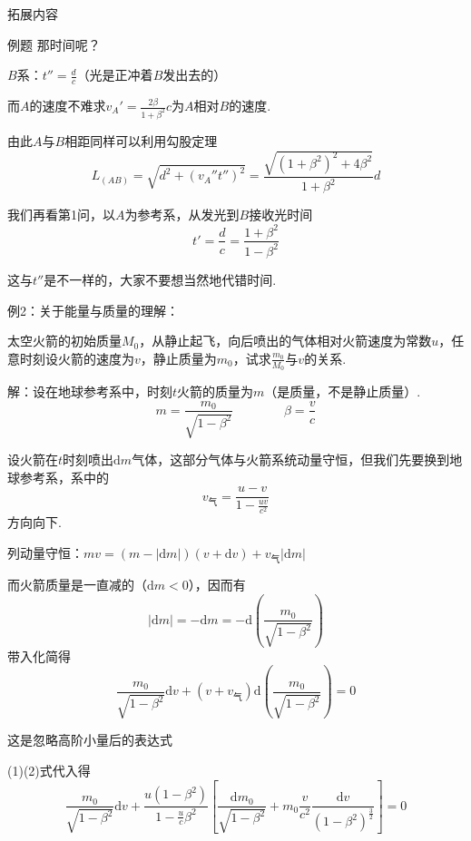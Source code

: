 \documentclass[a4paper,titlepage,onecolmn]{ctexart}
\newcommand{\di}[1]{\mathrm{d}#1}
\begin{document}
\begin{section}{拓展内容}
\begin{subsection}{例题}
那时间呢？

$B$系：$t''=\frac{d}{c}$（光是正冲着$B$发出去的）

而$A$的速度不难求\hspace{2em}$v_A'=\frac{2\beta}{1+\beta^2}c$为$A$相对$B$的速度.

由此$A$与$B$相距同样可以利用勾股定理
\begin{equation*}
L_(AB)=\sqrt{d^2+(v_A''t'')^2}=\frac{\sqrt{(1+\beta^2)^2+4\beta^2}}{1+\beta^2}d
\end{equation*}

我们再看第1问，以$A$为参考系，从发光到$B$接收光时间
\begin{equation*}
t'=\frac{d}{c}=\frac{1+\beta^2}{1-\beta^2}
\end{equation*}

这与$t''$是不一样的，大家不要想当然地代错时间.

例2：关于能量与质量的理解：

太空火箭的初始质量$M_0$，从静止起飞，向后喷出的气体相对火箭速度为常数$u$，任意时刻设火箭的速度为$v$，静止质量为$m_0$，试求$\frac{m_0}{M_0}$与$v$的关系.

解：设在地球参考系中，时刻$t$火箭的质量为$m$（是质量，不是静止质量）.
\begin{equation*}
m=\frac{m_0}{\sqrt{1-\beta^2}}\hspace{4em}\beta=\frac{v}{c}
\end{equation*}

设火箭在$t$时刻喷出$\di m$气体，这部分气体与火箭系统动量守恒，但我们先要换到地球参考系，系中的
\begin{equation*}
v_{\mbox{气}}=\frac{u-v}{1-\frac{uv}{c^2}}
\end{equation*}
方向向下.

列动量守恒：$mv=(m-|\di m|)(v+\di v)+v_{\mbox{气}}|\di m|$

而火箭质量是一直减的（$\di m<0$），因而有
\begin{equation}
|\di m|=-\di m=-\di(\frac{m_0}{\sqrt{1-\beta^2}})
\end{equation}
带入化简得
\begin{equation}
\frac{m_0}{\sqrt{1-\beta^2}}\di v+(v+v_{\mbox{气}})\di(\frac{m_0}{\sqrt{1-\beta^2}})=0
\end{equation}

这是忽略高阶小量后的表达式

(1)(2)式代入得
\begin{equation*}
\frac{m_0}{\sqrt{1-\beta^2}}\di v+\frac{u(1-\beta^2)}{1-\frac{u}{c}\beta^2}[\frac{\di m_0}{\sqrt{1-\beta^2}}
+m_0\frac{v}{c^2}\frac{\di v}{(1-\beta^2)^{\frac{3}{2}}}]=0
\end{equation*}


\end{subsection}
\end{section}
\end{document}
